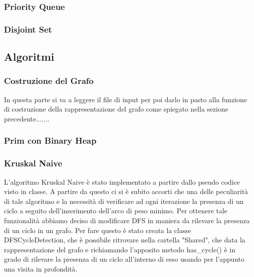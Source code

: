 \subsubsection{Priority Queue}

\subsubsection{Disjoint Set}

\subsection{Algoritmi}

\subsubsection {Costruzione del Grafo}
In questa parte si va a leggere il file di input per poi darlo in pasto alla funzione di costruzione della rappresentazione del grafo come spiegato nella sezione precedente.......

\subsubsection{Prim con Binary Heap}

\subsubsection{Kruskal Naive}
L'algoritmo Kruskal Naive è stato implementato a partire dallo pseudo codice visto in classe. A partire da questo ci si è subito accorti che una delle peculiarità di tale algoritmo e la necessità di verificare ad ogni iterazione la presenza di un ciclo a seguito dell'inserimento dell'arco di peso minimo. Per ottenere tale funzionalità abbiamo deciso di modificare DFS in maniera da rilevare la presenza di un ciclo in un grafo. Per fare questo è stato creata la classe DFSCycleDetection, che è possibile ritrovare nella cartella "Shared", che data la rappresentazione del grafo e richiamando l'apposito metodo has\_cycle() è in grado di rilevare la presenza di un ciclo all'interno di esso usando per l'appunto una visita in profondità.\\

